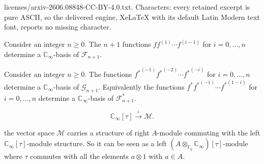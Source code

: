\documentclass[10pt,a4paper]{amsart}
\newcommand{\CC}{\mathbb{C}}
\newcommand{\FF}{\mathbb{F}}
\begin{document}
licenses/arxiv-2606.08848-CC-BY-4.0.txt. Characters: every retained excerpt is pure ASCII, so the delivered engine, XeLaTeX with its default Latin Modern text font, reports no missing character.
\begin{Corollary}\label{corollary-better-bases}
Consider an integer $n\geq 0$. The $n+1$ functions $ff^{(1)}\cdots f^{(i-1)}$ for $i=0,\ldots,n$ determine a $\CC_\infty$-basis of $\mathcal{F}_{n+1}$.
\end{Corollary}

\begin{Corollary}\label{corollary-better-bases-dual}
Consider an integer $n\geq 0$. The functions ${f^*}^{(-1)}{f^*}^{(-2)}\cdots {f^*}^{(-i)}$ for $i=0,\ldots,n$ determine a $\CC_\infty$-basis of $\mathcal{G}_{n+1}$. Equivalently the functions ${f^*}{f^*}^{(-1)}\cdots {f^*}^{(1-i)}$ for $i=0,\ldots,n$ determine a $\CC_\infty$-basis of $\mathcal{F}^*_{n+1}$.
\end{Corollary}

\begin{equation}\label{iota-iso}
\CC_\infty[\tau]\xrightarrow{\iota}\mathcal{M}.
\end{equation}

\begin{Lemma}\label{anderson-motives}
the vector space $\mathcal{M}$ carries a structure of right $A$-module commuting with the left $\CC_\infty[\tau]$-module structure.
So it can be seen as a left $(A\otimes_{\FF_q}\CC_\infty)[\tau]$-module where $\tau$ commutes with all the elements $a\otimes1$ with $a\in A$.
\end{Lemma}
\end{document}
